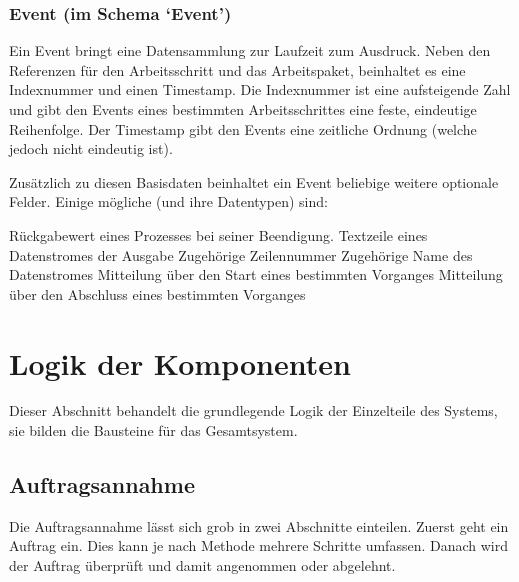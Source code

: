 

\subsubsection{Event (im Schema `Event')}

Ein Event bringt eine Datensammlung zur Laufzeit zum Ausdruck.
Neben den Referenzen für den Arbeitsschritt und das Arbeitspaket,
beinhaltet es eine Indexnummer und einen Timestamp.
Die Indexnummer ist eine aufsteigende Zahl
und gibt den Events eines bestimmten Arbeitsschrittes eine feste, eindeutige Reihenfolge.
Der Timestamp gibt den Events eine zeitliche Ordnung (welche jedoch nicht eindeutig ist).


Zusätzlich zu diesen Basisdaten beinhaltet ein Event beliebige weitere optionale Felder.
Einige mögliche (und ihre Datentypen) sind:

\begin{itemize}
     Rückgabewert eines Prozesses bei seiner Beendigung.
     Textzeile eines Datenstromes der Ausgabe
     Zugehörige Zeilennummer
     Zugehörige Name des Datenstromes
     Mitteilung über den Start eines bestimmten Vorganges
     Mitteilung über den Abschluss eines bestimmten Vorganges
\end{itemize}




\section{Logik der Komponenten}
\label{sec:design:logik}

Dieser Abschnitt behandelt die grundlegende Logik  der Einzelteile des Systems,
sie bilden die Bausteine für das Gesamtsystem.


\subsection{Auftragsannahme}

Die Auftragsannahme lässt sich grob in zwei Abschnitte einteilen.
Zuerst geht ein Auftrag ein.
Dies kann je nach Methode mehrere Schritte umfassen.
Danach wird der Auftrag überprüft und damit angenommen oder abgelehnt.


